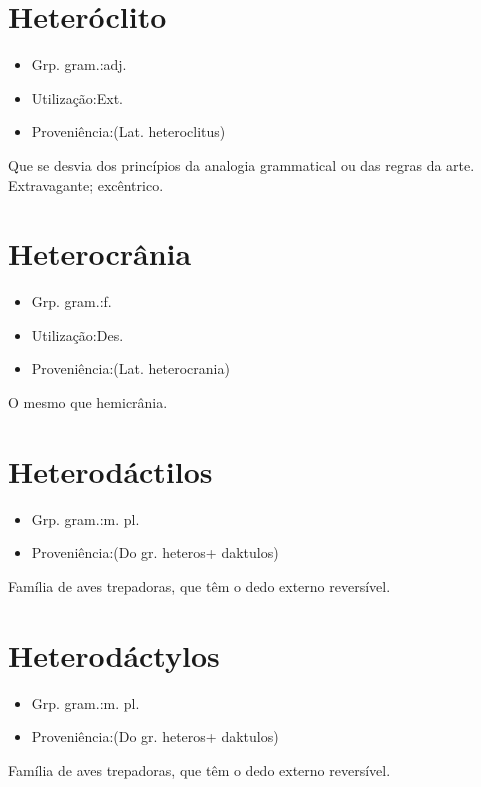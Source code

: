 \documentclass{article}
\begin{document}
\section{Heteróclito}
\begin{itemize}
\item {Grp. gram.:adj.}
\end{itemize}
\begin{itemize}
\item {Utilização:Ext.}
\end{itemize}
\begin{itemize}
\item {Proveniência:(Lat. \textunderscore heteroclitus\textunderscore )}
\end{itemize}
Que se desvia dos princípios da analogia grammatical ou das regras da arte.
Extravagante; excêntrico.
\section{Heterocrânia}
\begin{itemize}
\item {Grp. gram.:f.}
\end{itemize}
\begin{itemize}
\item {Utilização:Des.}
\end{itemize}
\begin{itemize}
\item {Proveniência:(Lat. \textunderscore heterocrania\textunderscore )}
\end{itemize}
O mesmo que \textunderscore hemicrânia\textunderscore .
\section{Heterodáctilos}
\begin{itemize}
\item {Grp. gram.:m. pl.}
\end{itemize}
\begin{itemize}
\item {Proveniência:(Do gr. \textunderscore heteros\textunderscore  + \textunderscore daktulos\textunderscore )}
\end{itemize}
Família de aves trepadoras, que têm o dedo externo reversível.
\section{Heterodáctylos}
\begin{itemize}
\item {Grp. gram.:m. pl.}
\end{itemize}
\begin{itemize}
\item {Proveniência:(Do gr. \textunderscore heteros\textunderscore  + \textunderscore daktulos\textunderscore )}
\end{itemize}
Família de aves trepadoras, que têm o dedo externo reversível.
\end{document}
